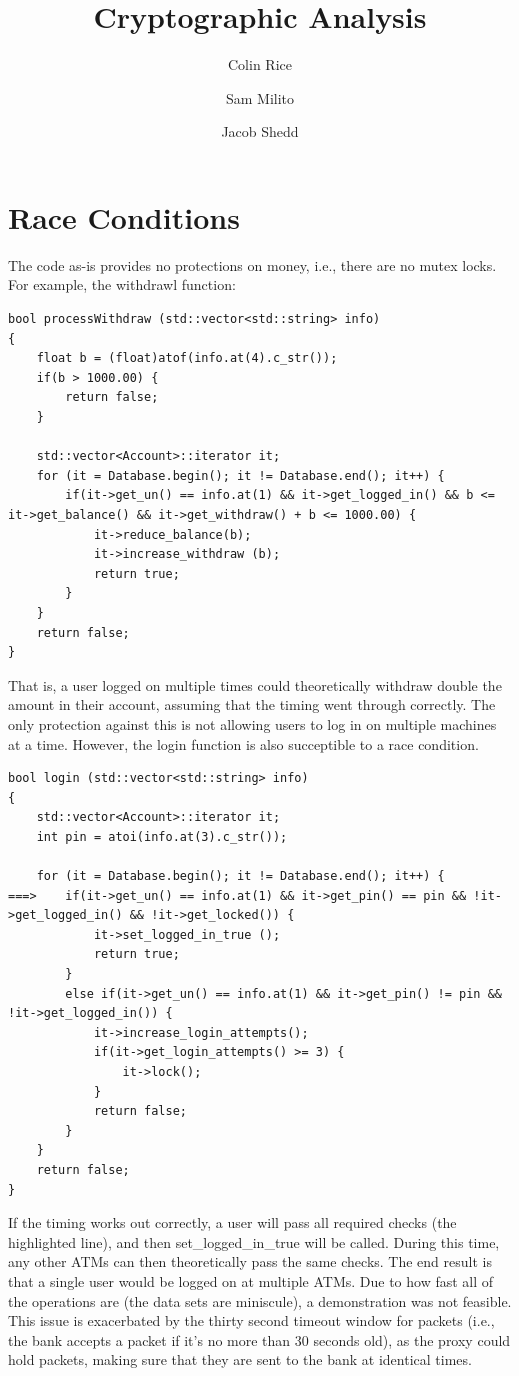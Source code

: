 \documentclass{article}
\begin{document}
\title{Cryptographic Analysis}
\author{Colin Rice}
\author{Sam Milito}
\author{Jacob Shedd}

\maketitle


\section{Race Conditions}

The code as-is provides no protections on money, i.e., there are no mutex locks. For example, the withdrawl function:
\begin{lstlisting}
bool processWithdraw (std::vector<std::string> info)
{
	float b = (float)atof(info.at(4).c_str());
	if(b > 1000.00) {
		return false;
	}

	std::vector<Account>::iterator it;
	for (it = Database.begin(); it != Database.end(); it++) {
		if(it->get_un() == info.at(1) && it->get_logged_in() && b <= it->get_balance() && it->get_withdraw() + b <= 1000.00) {
			it->reduce_balance(b);
			it->increase_withdraw (b);
			return true;
		}
	}
	return false;
}
\end{lstlisting}
That is, a user logged on multiple times could theoretically withdraw double the amount in their account, assuming that the timing went through correctly. The only protection against this is not allowing users to log in on multiple machines at a time. However, the login function is also succeptible to a race condition.

\begin{lstlisting}
bool login (std::vector<std::string> info) 
{
	std::vector<Account>::iterator it;
	int pin = atoi(info.at(3).c_str());

	for (it = Database.begin(); it != Database.end(); it++) {
===>	if(it->get_un() == info.at(1) && it->get_pin() == pin && !it->get_logged_in() && !it->get_locked()) {
			it->set_logged_in_true ();
			return true;
		} 
		else if(it->get_un() == info.at(1) && it->get_pin() != pin && !it->get_logged_in()) {
			it->increase_login_attempts();
			if(it->get_login_attempts() >= 3) {
				it->lock();
			}
			return false;
		}
	}
	return false;
}
\end{lstlisting}
If the timing works out correctly, a user will pass all required checks (the highlighted line), and then set\_logged\_in\_true will be called. During this time, any other ATMs can then theoretically pass the same checks. The end result is that a single user would be logged on at multiple ATMs. Due to how fast all of the operations are (the data sets are miniscule), a demonstration was not feasible. This issue is exacerbated by the thirty second timeout window for packets (i.e., the bank accepts a packet if it's no more than 30 seconds old), as the proxy could hold packets, making sure that they are sent to the bank at identical times.
\end{document}
